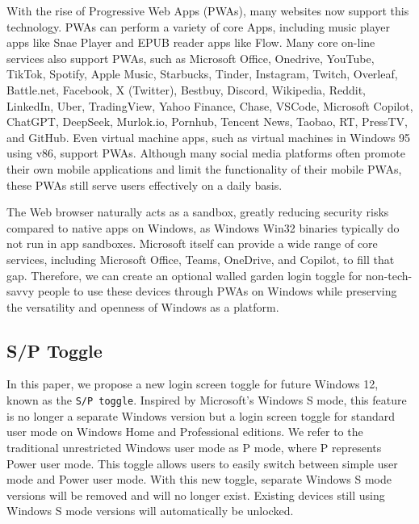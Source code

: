 With the rise of Progressive Web Apps (PWAs)\cite{8399228, webDevPWA}, many websites now support this technology. PWAs can perform a variety of core Apps, including music player apps like Snae Player\cite{snaeplayer} and EPUB reader apps like Flow\cite{flowossApp}. Many core on-line services also support PWAs, such as Microsoft Office, Onedrive, YouTube, TikTok, Spotify, Apple Music, Starbucks, Tinder, Instagram, Twitch, Overleaf, Battle.net, Facebook, X (Twitter), Bestbuy, Discord, Wikipedia, Reddit, LinkedIn, Uber, TradingView, Yahoo Finance, Chase, VSCode, Microsoft Copilot, ChatGPT, DeepSeek, Murlok.io, Pornhub, Tencent News, Taobao, RT, PressTV, and GitHub. Even virtual machine apps, such as virtual machines in Windows 95 using v86, support PWAs. Although many social media platforms often promote their own mobile applications and limit the functionality of their mobile PWAs, these PWAs still serve users effectively on a daily basis.

The Web browser naturally acts as a sandbox, greatly reducing security risks compared to native apps on Windows, as Windows Win32 binaries typically do not run in app sandboxes. Microsoft itself can provide a wide range of core services, including Microsoft Office, Teams, OneDrive, and Copilot, to fill that gap. Therefore, we can create an optional walled garden login toggle for non-tech-savvy people to use these devices through PWAs on Windows while preserving the versatility and openness of Windows as a platform.

\subsection{S/P Toggle}
In this paper, we propose a new login screen toggle for future Windows 12, known as the \texttt{S/P toggle}. Inspired by Microsoft's Windows S mode, this feature is no longer a separate Windows version but a login screen toggle for standard user mode on Windows Home and Professional editions. We refer to the traditional unrestricted Windows user mode as P mode, where P represents Power user mode. This toggle allows users to easily switch between simple user mode and Power user mode. With this new toggle, separate Windows S mode versions will be removed and will no longer exist. Existing devices still using Windows S mode versions will automatically be unlocked.

